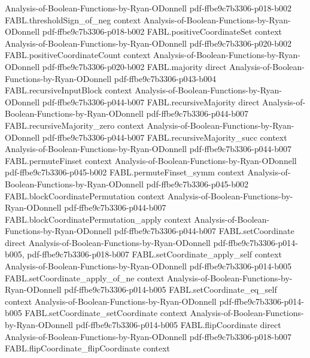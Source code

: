 \begin{theorem}
  {Analysis-of-Boolean-Functions-by-Ryan-ODonnell}
  {pdf-ffbe9c7b3306-p018-b002}
\proofstep
  {FABL.thresholdSign_of_neg}
  {context}
  {Analysis-of-Boolean-Functions-by-Ryan-ODonnell}
  {pdf-ffbe9c7b3306-p018-b002}
\proofstep
  {FABL.positiveCoordinateSet}
  {context}
  {Analysis-of-Boolean-Functions-by-Ryan-ODonnell}
  {pdf-ffbe9c7b3306-p020-b002}
\proofstep
  {FABL.positiveCoordinateCount}
  {context}
  {Analysis-of-Boolean-Functions-by-Ryan-ODonnell}
  {pdf-ffbe9c7b3306-p020-b002}
\proofstep
  {FABL.majority}
  {direct}
  {Analysis-of-Boolean-Functions-by-Ryan-ODonnell}
  {pdf-ffbe9c7b3306-p043-b004}
\proofstep
  {FABL.recursiveInputBlock}
  {context}
  {Analysis-of-Boolean-Functions-by-Ryan-ODonnell}
  {pdf-ffbe9c7b3306-p044-b007}
\proofstep
  {FABL.recursiveMajority}
  {direct}
  {Analysis-of-Boolean-Functions-by-Ryan-ODonnell}
  {pdf-ffbe9c7b3306-p044-b007}
\proofstep
  {FABL.recursiveMajority_zero}
  {context}
  {Analysis-of-Boolean-Functions-by-Ryan-ODonnell}
  {pdf-ffbe9c7b3306-p044-b007}
\proofstep
  {FABL.recursiveMajority_succ}
  {context}
  {Analysis-of-Boolean-Functions-by-Ryan-ODonnell}
  {pdf-ffbe9c7b3306-p044-b007}
\proofstep
  {FABL.permuteFinset}
  {context}
  {Analysis-of-Boolean-Functions-by-Ryan-ODonnell}
  {pdf-ffbe9c7b3306-p045-b002}
\proofstep
  {FABL.permuteFinset_symm}
  {context}
  {Analysis-of-Boolean-Functions-by-Ryan-ODonnell}
  {pdf-ffbe9c7b3306-p045-b002}
\proofstep
  {FABL.blockCoordinatePermutation}
  {context}
  {Analysis-of-Boolean-Functions-by-Ryan-ODonnell}
  {pdf-ffbe9c7b3306-p044-b007}
\proofstep
  {FABL.blockCoordinatePermutation_apply}
  {context}
  {Analysis-of-Boolean-Functions-by-Ryan-ODonnell}
  {pdf-ffbe9c7b3306-p044-b007}
\proofstep
  {FABL.setCoordinate}
  {direct}
  {Analysis-of-Boolean-Functions-by-Ryan-ODonnell}
  {pdf-ffbe9c7b3306-p014-b005,
    pdf-ffbe9c7b3306-p018-b007}
\proofstep
  {FABL.setCoordinate_apply_self}
  {context}
  {Analysis-of-Boolean-Functions-by-Ryan-ODonnell}
  {pdf-ffbe9c7b3306-p014-b005}
\proofstep
  {FABL.setCoordinate_apply_of_ne}
  {context}
  {Analysis-of-Boolean-Functions-by-Ryan-ODonnell}
  {pdf-ffbe9c7b3306-p014-b005}
\proofstep
  {FABL.setCoordinate_eq_self}
  {context}
  {Analysis-of-Boolean-Functions-by-Ryan-ODonnell}
  {pdf-ffbe9c7b3306-p014-b005}
\proofstep
  {FABL.setCoordinate_setCoordinate}
  {context}
  {Analysis-of-Boolean-Functions-by-Ryan-ODonnell}
  {pdf-ffbe9c7b3306-p014-b005}
\proofstep
  {FABL.flipCoordinate}
  {direct}
  {Analysis-of-Boolean-Functions-by-Ryan-ODonnell}
  {pdf-ffbe9c7b3306-p018-b007}
\proofstep
  {FABL.flipCoordinate_flipCoordinate}
  {context}

\end{theorem}
